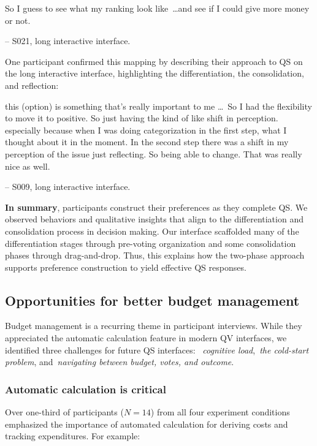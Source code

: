 \begin{displayquote}
    So I guess to see what my ranking look like~\ldots and see if I could give more money or not.

    \noindent \hfill -- S021, long interactive interface.
\end{displayquote}

One participant confirmed this mapping by describing their approach to QS on the long interactive interface, highlighting the differentiation, the consolidation, and reflection:

\begin{displayquote}
\bracketellipsis this (option) is something that's really important to me \ldots\ So I had the flexibility to move it to positive. So just having the kind of like shift in perception. \bracketellipsis especially because when I was doing categorization in the first step, \bracketellipsis what I thought about it in the moment. \bracketellipsis In the second step there was a shift in my perception of the issue just reflecting. So being able to change. That was really nice as well.

\noindent \hfill -- S009, long interactive interface.
\end{displayquote}

\textbf{In summary}, participants construct their preferences as they complete QS. We observed behaviors and qualitative insights that align to the differentiation and consolidation process in decision making. Our interface scaffolded many of the differentiation stages through pre-voting organization and some consolidation phases through drag-and-drop. Thus, this explains how the two-phase approach supports preference construction to yield effective QS responses.

\subsection{Opportunities for better budget management}
Budget management is a recurring theme in participant interviews. While they appreciated the automatic calculation feature in modern QV interfaces, we identified three challenges for future QS interfaces: ~\textit{cognitive load},~\textit{the cold-start problem}, and~\textit{navigating between budget, votes, and outcome}.

\subsubsection{Automatic calculation is critical}
Over one-third of participants ($N=14$) from all four experiment conditions emphasized the importance of automated calculation for deriving costs and tracking expenditures. For example:

